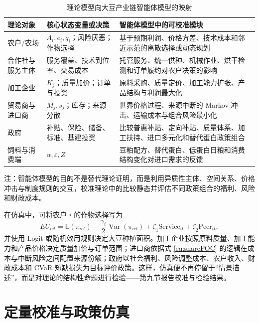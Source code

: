 \documentclass[UTF8,zihao=-4,fontset=fandol]{ctexart}
\numberwithin{equation}{section}
\theoremstyle{definition}
\theoremstyle{remark}
\newcommand{\E}{\mathbb{E}}
\newcommand{\Var}{\operatorname{Var}}
\begin{document}
\begin{table}[H]
\centering
\caption{理论模型向大豆产业链智能体模型的映射}
\label{tab:abm}
\begin{threeparttable}
\begin{tabularx}{\textwidth}{p{}p{}X}
\toprule
理论对象 & 核心状态变量或决策 & 智能体模型中的可校准模块\\
\midrule
农户/农场 & $A_i,e_i,q_i$；风险厌恶；作物选择 & 基于预期利润、价格方差、技术成本和邻近示范的离散选择或动态规划\\
合作社与服务主体 & 服务覆盖、技术到位率、交易成本 & 托管服务、统一供种、机械作业、烘干检测和订单履约对农户决策的影响\\
加工企业 & $K_j$；质量加价；订单与投资 & 原料采购、质量定价、加工能力扩张、产品结构与利润最大化\\
贸易商与进口商 & $M_j,s_j$；库存；来源分散 & 世界价格过程、来源中断的 Markov 冲击、运输成本与组合风险最小化\\
政府 & 补贴、保险、储备、标准、基建投资 & 比较普惠补贴、定向补贴、质量体系、加工扶持、进口多元化和替代蛋白政策组合\\
饲料与消费端 & $\alpha,\varepsilon,Z$ & 豆粕配方、替代蛋白、低蛋白日粮和消费结构变化对进口需求的反馈\\
\bottomrule
\end{tabularx}
\begin{tablenotes}[flushleft]
\footnotesize
\item 注：智能体模型的目的不是替代理论证明，而是利用异质性主体、空间关系、价格冲击与制度规则的交互，校准理论中的比较静态并评估不同政策组合的福利、风险和财政成本。
\end{tablenotes}
\end{threeparttable}
\end{table}

在仿真中，可将农户 $i$ 的作物选择写为
\begin{equation}
 EU_{ict}=\E(\pi_{ict})-\frac{\gamma_i}{2}\Var(\pi_{ict})+\zeta_1\mathrm{Service}_{it}+\zeta_2\mathrm{Peer}_{it},
 \label{eq:abmfarmer}
\end{equation}
并使用 Logit 或随机效用规则决定大豆种植面积。加工企业按照原料质量、加工能力和产品价格决定质量加价与订单范围；进口商依据式 \eqref{eq:shareFOC} 的逻辑在成本与中断风险之间配置来源份额；政府以社会福利、风险调整成本、农户收入、财政成本和 CVaR 短缺损失为目标评价政策。这样，仿真便不再停留于“情景描述”，而是对理论的结构性命题进行检验——第九节报告校准与检验结果。

\section{定量校准与政策仿真}
\end{document}
